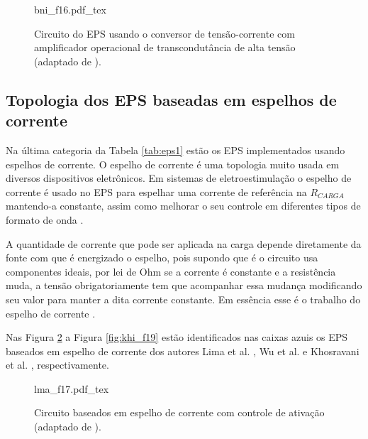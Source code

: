 \begin{figure}[h]
    \centering %
    \small %
    \def\svgwidth{0.57
    \columnwidth}%
    {bni_f16.pdf_tex}
    \caption{Circuito do EPS usando o conversor de tensão-corrente com amplificador operacional de transcondutância de alta tensão (adaptado de \cite{Brunetti2011}).}
    \label{fig:bni_f16}
\end{figure}

\subsection*{Topologia dos \acrshort{EPS} baseadas em espelhos de corrente}
Na última categoria da Tabela \ref{tab:eps1} estão os EPS implementados usando espelhos de corrente. O espelho de corrente é uma topologia muito usada em diversos dispositivos eletrônicos. Em sistemas de eletroestimulação o espelho de corrente é usado no EPS para espelhar uma corrente de referência na $R_{CARGA}$ mantendo-a constante, assim como melhorar o seu controle em diferentes tipos de formato de onda \cite{Kaczmarek1991, Souza2017, Boylestad2013}. %

A quantidade de corrente que pode ser aplicada na carga depende diretamente da fonte com que é energizado o espelho, pois supondo que é o circuito usa componentes ideais, por lei de Ohm se a corrente é constante e a resistência muda, a tensão obrigatoriamente tem que acompanhar essa mudança modificando seu valor para manter a dita corrente constante. Em essência esse é o trabalho do espelho de corrente \cite{Boylestad2013}. %

Nas Figura \ref{fig:lma_f17} a Figura \ref{fig:khi_f19} estão identificados nas caixas azuis os EPS baseados em espelho de corrente dos autores Lima et al. \cite{DeLima2002}, Wu et al. \cite{Wu2002} e Khosravani et al. \cite{KhosravaniSanaz2011}, respectivamente.

\begin{figure}[h]
    \centering %
    \small %
    \def\svgwidth{0.6
    \columnwidth}%
    {lma_f17.pdf_tex}
    \caption{Circuito baseados em espelho de corrente com controle de ativação (adaptado de \cite{DeLima2002}).}
    \label{fig:lma_f17}
\end{figure}

